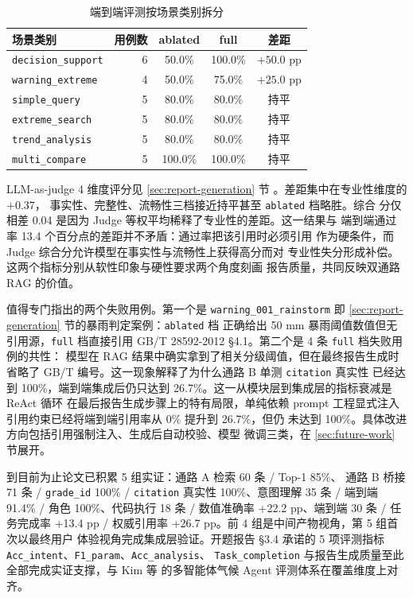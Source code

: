 \begin{table}[H]
    \centering
    \caption{端到端评测按场景类别拆分}
    \label{tab:e2e-by-category}
    \song\wuhao
    \begin{tabular}{lrccc}
        \toprule
        场景类别 & 用例数 & ablated & full & 差距 \\
        \midrule
        \texttt{decision\_\bk{}support} & 6 & 50.0\% & 100.0\% & $+50.0$ pp \\
        \texttt{warning\_\bk{}extreme} & 4 & 50.0\% & 75.0\% & $+25.0$ pp \\
        \texttt{simple\_\bk{}query} & 5 & 80.0\% & 80.0\% & 持平 \\
        \texttt{extreme\_\bk{}search} & 5 & 80.0\% & 80.0\% & 持平 \\
        \texttt{trend\_\bk{}analysis} & 5 & 80.0\% & 80.0\% & 持平 \\
        \texttt{multi\_\bk{}compare} & 5 & 100.0\% & 100.0\% & 持平 \\
        \bottomrule
    \end{tabular}
\end{table}

LLM-as-judge 4 维度评分见 \ref{sec:report-generation} 节
。差距集中在专业性维度的 $+0.37$，
事实性、完整性、流畅性三档接近持平甚至 \texttt{ablated} 档略胜。综合
分仅相差 0.04 是因为 Judge 等权平均稀释了专业性的差距。这一结果与
端到端通过率 13.4 个百分点的差距并不矛盾：通过率把该引用时必须引用
作为硬条件，而 Judge 综合分允许模型在事实性与流畅性上获得高分而对
专业性失分形成补偿。这两个指标分别从软性印象与硬性要求两个角度刻画
报告质量，共同反映双通路 RAG 的价值。

值得专门指出的两个失败用例。第一个是 \texttt{warning\_\bk{}001\_\bk{}rainstorm}
即 \ref{sec:report-generation} 节的暴雨判定案例：\texttt{ablated} 档
正确给出 50 mm 暴雨阈值数值但无引用源，\texttt{full} 档直接引用
GB/T 28592-2012 §4.1。第二个是 4 条 \texttt{full} 档失败用例的共性：
模型在 RAG 结果中确实拿到了相关分级阈值，但在最终报告生成时省略了
GB/T 编号。这一现象解释了为什么通路 B 单测 \texttt{citation} 真实性
已经达到 100\%，端到端集成后仍只达到 26.7\%。这一从模块层到集成层的指标衰减是 ReAct
循环 \cite{ref18} 在最后报告生成步骤上的特有局限，单纯依赖 prompt
工程显式注入引用约束已经将端到端引用率从 0\% 提升到 26.7\%，但仍
未达到 100\%。具体改进方向包括引用强制注入、生成后自动校验、模型
微调三类，在 \ref{sec:future-work} 节展开。

到目前为止论文已积累 5 组实证：通路 A 检索 60 条 / Top-1 85\%、
通路 B 桥接 71 条 / \texttt{grade\_\bk{}id} 100\% / \texttt{citation}
真实性 100\%、意图理解 35 条 / 端到端 91.4\% / 角色 100\%、代码执行
18 条 / 数值准确率 +22.2 pp、端到端 30 条 / 任务完成率 +13.4 pp /
权威引用率 +26.7 pp。前 4 组是中间产物视角，第 5 组首次以最终用户
体验视角完成集成层验证。开题报告 §3.4 承诺的 5 项评测指标
\texttt{Acc\_\bk{}intent}、\texttt{F1\_\bk{}param}、\texttt{Acc\_\bk{}analysis}、
\texttt{Task\_\bk{}completion} 与报告生成质量至此全部完成实证支撑，与
Kim 等 \cite{ref1} 的多智能体气候 Agent 评测体系在覆盖维度上对齐。
